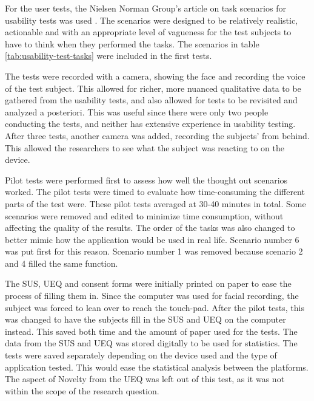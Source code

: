 

For the user tests, the Nielsen Norman Group’s article on task scenarios for usability tests was used \cite{NielsenTask2014}. The scenarios were designed to be relatively realistic, actionable and with an appropriate level of vagueness for the test subjects to have to think when they performed the tasks. The scenarios in table \ref{tab:usability-test-tasks} were included in the first tests.



The tests were recorded with a camera, showing the face and recording the voice of the test subject. This allowed for richer, more nuanced qualitative data to be gathered from the usability tests, and also allowed for tests to be revisited and analyzed a posteriori. This was useful since there were only two people conducting the tests, and neither has extensive experience in usability testing. After three tests, another camera was added, recording the subjects' from behind. This allowed the researchers to see what the subject was reacting to on the device.

Pilot tests were performed first to assess how well the thought out scenarios worked. The pilot tests were timed to evaluate how time-consuming the different parts of the test were. These pilot tests averaged at 30-40 minutes in total. Some scenarios were removed and edited to minimize time consumption, without affecting the quality of the results. The order of the tasks was also changed to better mimic how the application would be used in real life. Scenario number 6 was put first for this reason. Scenario number 1 was removed because scenario 2 and 4 filled the same function.

The SUS, UEQ and consent forms were initially printed on paper to ease the process of filling them in. Since the computer was used for facial recording, the subject was forced to lean over to reach the touch-pad. After the pilot tests, this was changed to have the subjects fill in the SUS and UEQ on the computer instead. This saved both time and the amount of paper used for the tests. The data from the SUS and UEQ was stored digitally to be used for statistics. The tests were saved separately depending on the device used and the type of application tested. This would ease the statistical analysis between the platforms. The aspect of Novelty from the UEQ was left out of this test, as it was not within the scope of the research question.


